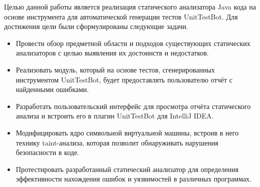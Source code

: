 
Целью данной работы является реализация статического анализатора Java кода на основе инструмента для автоматической генерации тестов UnitTestBot. Для достижения цели были сформулированы следующие задачи.

\begin{itemize}
    \item Провести обзор предметной области и подходов существующих статических анализаторов с целью выявления их достоинств и недостатков.
    \item Реализовать модуль, который на основе тестов, сгенерированных инструментом UnitTestBot, будет предоставлять пользователю отчёт с найденными ошибками.
    \item Разработать пользовательский интерфейс для просмотра отчёта статического анализа и встроить его в плагин UnitTestBot для IntelliJ IDEA.
    \item Модифицировать ядро символьной виртуальной машины, встроив в него технику taint-анализа, которая позволит обнаруживать нарушения безопасности в коде.
    \item Протестировать разработанный статический анализатор для определения эффективности нахождения ошибок и уязвимостей в различных программах.
\end{itemize}
